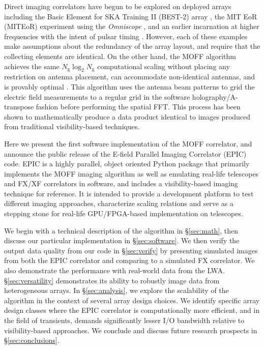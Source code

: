\documentclass[a4paper,fleqn,usenatbib]{mnras}
\newcommand{\Ngrid}{N_\textrm{g}}
\begin{document}
Direct imaging correlators have begun to be explored on deployed arrays including the Basic Element for SKA Training II (BEST-2) array \citep{fos14}, the MIT EoR (MITEoR) experiment \citep{zhe14} using the {\it Omniscope} \citep{teg09,teg10}, and an earlier incarnation at higher frequencies with the intent of pulsar timing \citep{oto94,dai00}. However, each of these examples make assumptions about the redundancy of the array layout, and require that the collecting elements are identical. On the other hand, the MOFF algorithm achieves the same $\Ngrid \log_2 \Ngrid$ computational scaling without placing any restriction on antenna placement, can accommodate non-identical antennas, and is provably optimal \citep{mor11}. This algorithm uses the antenna beam patterns to grid the electric field measurements to a regular grid in the software holography/A-transpose fashion \citep{mor09,bha08,teg97b} before performing the spatial FFT. This process has been shown to mathematically produce a data product identical to images produced from traditional visibility-based techniques.

Here we present the first software implementation of the MOFF correlator, and
announce the public release of the E-field Parallel Imaging Correlator (EPIC)
code. EPIC is a highly parallel, object oriented Python package that primarily 
implements the MOFF imaging algorithm as well as emulating real-life telescopes and 
FX/XF correlators in software, and includes a visibility-based imaging technique 
for reference. It is intended to provide a development platform to test different 
imaging approaches, characterize scaling relations and serve as a stepping stone 
for real-life GPU/FPGA-based implementation on telescopes.

We begin with a technical description of the algorithm in \S\ref{sec:math}, then discuss our particular implementation in \S\ref{sec:software}. We then verify the output data quality from our code in \S\ref{sec:verify} by presenting simulated images from both the EPIC correlator and comparing to a simulated FX correlator. We also demonstrate the performance with real-world data from the LWA. \S\ref{sec:versatility} demonstrates its ability to robustly image data from heterogeneous arrays. In \S\ref{sec:analysis}, we explore the scalability of the algorithm in the context of several array design choices. We identify specific array design classes where the EPIC correlator is computationally more efficient, and in the field of transients, demands significantly lesser I/O bandwidth relative to visibility-based approaches. We conclude and discuss future research prospects in \S\ref{sec:conclusions}.
\end{document}
